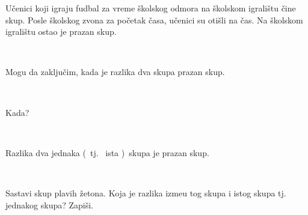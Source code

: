     \begin{zad}

        U\v cenici koji igraju fudbal za vreme \v skolskog odmora na \v skolskom igrali\v stu \v cine skup. Posle \v skolskog zvona za po\v cetak \v casa, u\v cenici su oti\v sli na \v cas. Na \v skolskom igrali\v stu ostao je prazan skup.

        \

        

        Mogu da zaklju\v cim, kada je razlika dva skupa prazan skup.

        \ 

        Kada?

        \

        

        Razlika dva jednaka (\ tj. \ ista )\ skupa je prazan skup.

        \

    \end{zad}

    \begin{zad} 

        Sastavi skup plavih \v zetona. Koja je razlika izme\dj u tog skupa i istog skupa  tj. jednakog skupa? Zapi\v si.

        \

    \end{zad}

